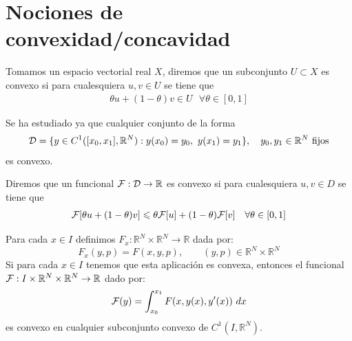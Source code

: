 \documentclass[12pt]{book}
\begin{document}
    \section{Nociones de convexidad/concavidad}

    \begin{definicion}
        Tomamos un espacio vectorial real $X$, diremos que un subconjunto $U\subset X$ es convexo si para cualesquiera $u,v\in U$ se tiene que 
        \begin{gather*}
            \theta u + (1-\theta) v \in U \ \ \ \forall \theta \in[0,1]
        \end{gather*}
    \end{definicion}

    Se ha estudiado ya que cualquier conjunto de la forma
    \begin{gather}\label{def-dominio}
        \cc{D}= \{y\in C^1([x_0, x_1],\bb{R}^N) : y(x_0)=y_0,\ y(x_1)=y_1\},\ \ \ y_0,y_1\in \bb{R}^N \text{ fijos}
    \end{gather}
    es convexo.

    \begin{definicion}
        Diremos que un funcional $\mathcal{F} : \mathcal{D} \to \mathbb{R}$ es convexo si para cualesquiera $u,v\in D$ se tiene que
        \begin{gather*}
            \mathcal{F}[\theta u + (1-\theta) v] \leqslant \theta\mathcal{F}[u] + (1-\theta) \mathcal{F}[v] \ \ \ \forall \theta \in [0,1]
        \end{gather*}
    \end{definicion}

    \begin{lema}
        Para cada $x\in I$ definimos $F_x:\mathbb{R}^N\times\mathbb{R}^N\to \mathbb{R}$ dada por:
        \begin{equation*}
            F_x(y,p) = F(x,y,p), \qquad (y,p)\in \mathbb{R}^N\times\mathbb{R}^N
        \end{equation*}
        Si para cada $x\in I$ tenemos que esta aplicación es convexa, entonces el funcional $\mathcal{F}:I\times\mathbb{R}^N\times \mathbb{R}^N\to \mathbb{R}$ dado por:
        \begin{equation*}
            \mathcal{F}(y) = \int_{x_0}^{x_1} F(x,y(x),y'(x))~dx 
        \end{equation*}
        es convexo en cualquier subconjunto convexo de $C^1(I, \mathbb{R}^N)$.
    \end{lema}
\end{document}
